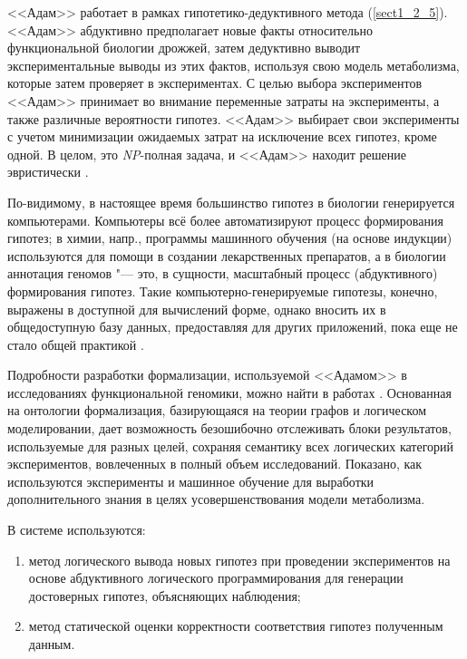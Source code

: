 <<Адам>> работает в рамках гипотетико-дедуктивного метода (\cref{sect1_2_5}). <<Адам>> абдуктивно предполагает новые факты 
относительно функциональной биологии дрожжей, затем дедуктивно выводит экспериментальные выводы из этих фактов, 
используя свою модель метаболизма, которые затем проверяет в экспериментах. С целью выбора экспериментов <<Адам>> 
принимает во внимание переменные затраты на эксперименты, а также различные вероятности гипотез. <<Адам>> выбирает 
свои эксперименты с учетом минимизации ожидаемых затрат на исключение всех гипотез, кроме одной. В целом, это 
\textit{NP}-полная задача, и <<Адам>> находит решение эвристически \cite{soldatova2011representation}.

По-видимому, в настоящее время большинство гипотез в биологии генерируется компьютерами. Компьютеры всё более 
автоматизируют процесс формирования гипотез; в химии, напр., программы машинного обучения (на основе индукции) 
используются для помощи в создании лекарственных препаратов, а в биологии аннотация геномов "--- это, в сущности, 
масштабный процесс (абдуктивного) формирования гипотез. Такие компьютерно-генерируемые гипотезы, конечно, выражены в 
доступной для вычислений форме, однако вносить их в общедоступную базу данных, предоставляя для других приложений, 
пока еще не стало общей практикой \cite{soldatova2011representation}.

Подробности разработки формализации, используемой <<Адамом>> в исследованиях функциональной геномики, можно найти в 
работах \cite{qi2010ontology,soldatova2011representation}. Основанная на онтологии формализация, базирующаяся на 
теории графов и логическом моделировании, дает возможность безошибочно отслеживать блоки результатов, используемые 
для разных целей, сохраняя семантику всех логических категорий экспериментов, вовлеченных в полный объем исследований. 
Показано, как используются эксперименты и машинное обучение для выработки дополнительного знания в целях 
усовершенствования модели метаболизма.

В системе используются: 

\begin{enumerate}
    \item метод логического вывода новых гипотез при проведении экспериментов на основе абдуктивного логического 
            программирования для генерации достоверных гипотез, объясняющих наблюдения;
    \item метод статической оценки корректности соответствия гипотез полученным данным.
\end{enumerate}

